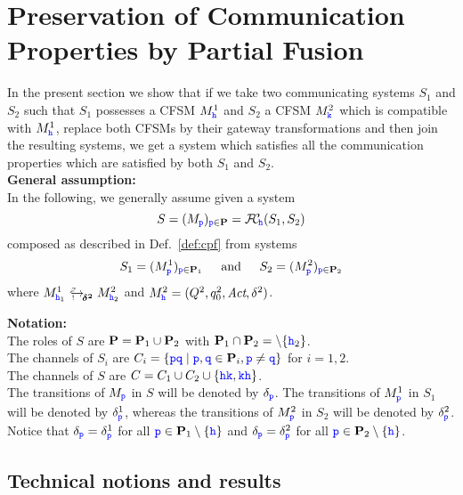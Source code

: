 


\section{Preservation of Communication Properties by Partial Fusion}
\label{sect:safetypreservation}


In the present section we show that if we take two communicating systems
$S_1$ and $S_2$ such that $S_1$ possesses a CFSM $M^1_\HH$ and $S_2$ a CFSM $M^2_\KK$ which is compatible with $M^1_\HH$, replace both CFSMs by their gateway transformations and then join the resulting systems, we get a system which satisfies all the communication properties which are satisfied by both $S_1$ and $S_2$.\\


\noindent
\textbf{General assumption:}\\ 
In the following, we generally assume given a
system  
$$S= (M_\ttp)_{\ttp\in\roles} = \fusioncomp_{\!\hh}(S_1,S_2)$$  
composed
as described in Def.~\ref{def:cpf}
from systems 
$$S_1= (M^1_\ttp)_{\ttp\in\roles_1}  \hspace{4mm} \text{ and } \hspace{4mm} S_2= (M^2_\ttp)_{\ttp\in\roles_2}$$ where $\emb{\bm{\delta^2}}{}{M^1_{\hh_1}}{M^2_{\hh_2}}$
and $M^2_\hh = (Q^2, q^2_0, \textit{Act}, \delta^2)$.



\vspace{2mm}
\noindent
\textbf{Notation:} \\
The roles of $S$ are $\roles=\roles_1\cup\roles_2$ with  $\roles_1\cap\roles_2=\setminus\Set{\hh_2}$.\\
The channels of $S_i$ are  $C_i=\Set{\ttp\ttq \mid \ttp,\ttq\in \roles_i, \ttp\neq\ttq}$ for $i=1,2$.\\
The channels of $S$ are 
$C=C_1\cup C_2\cup\Set{\HH\KK,\KK\HH}$.\\
The transitions of $M_\ttp$ in $S$ will be denoted by $\delta_\ttp$.
The transitions of $M^1_\ttp$ in $S_1$ will be denoted by $\delta^1_\ttp$, whereas the 
transitions of $M^2_\ttp$ in $S_2$ will be denoted by $\delta^2_\ttp$.
Notice that $\delta_\ttp = \delta^1_\ttp$ for all $\ttp\in\roles_1\setminus\Set{\HH}$
and $\delta_\ttp = \delta^2_\ttp$ for all $\ttp\in\roles_2\setminus\Set{\hh}$.



\subsection{Technical notions and results}

